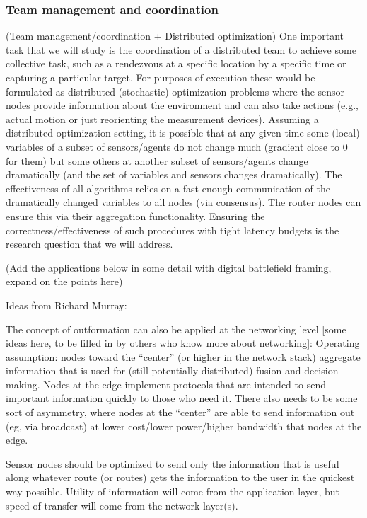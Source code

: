 \documentclass[12pt,letterpaper]{article}
\begin{document}
\subsubsection{Team management and coordination}\label{subsec:teams}

(Team management/coordination + Distributed optimization) One important task that we will study is the coordination of a distributed team to achieve some collective task, such as a rendezvous at a specific location by a specific time or capturing a particular target. For purposes of execution these would be formulated as distributed (stochastic) optimization problems where the sensor nodes provide information about the environment and can also take actions (e.g., actual motion or just reorienting the measurement devices). Assuming a distributed optimization setting, it is possible that at any given time some (local) variables of a subset of sensors/agents do not change much (gradient close to 0 for them) but some others at another subset of sensors/agents change dramatically (and the set of variables and sensors changes dramatically). The effectiveness of all algorithms relies on a fast-enough communication of the dramatically changed variables to all nodes (via consensus). The router nodes can ensure this via their aggregation functionality. Ensuring the correctness/effectiveness of such procedures with tight latency budgets is the research question that we will address.

(Add the applications below in some detail with digital battlefield framing, expand on the points here)

Ideas from Richard Murray:

The concept of outformation can also be applied at the networking level [some ideas here, to be filled in by others who know more about networking]:
Operating assumption: nodes toward the “center” (or higher in the network stack) aggregate information that is used for (still potentially distributed) fusion and decision-making.  Nodes at the edge implement protocols that are intended to send important information quickly to those who need it.  There also needs to be some sort of asymmetry, where nodes at the “center” are able to send information out (eg, via broadcast) at lower cost/lower power/higher bandwidth that nodes at the edge.

Sensor nodes should be optimized to send only the information that is useful along whatever route (or routes) gets the information to the user in the quickest way possible.  Utility of information will come from the application layer, but speed of transfer will come from the network layer(s).
\end{document}
